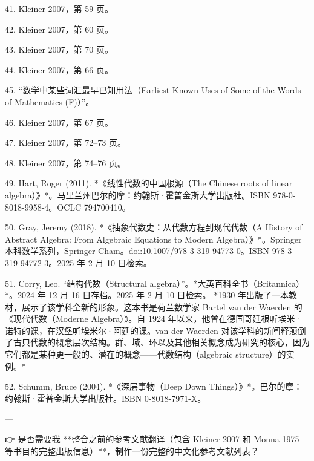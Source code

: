 \begin{enumerate}
41. Kleiner 2007，第 59 页。

42. Kleiner 2007，第 60 页。

43. Kleiner 2007，第 70 页。

44. Kleiner 2007，第 66 页。

45. “数学中某些词汇最早已知用法（Earliest Known Uses of Some of the Words of Mathematics (F)）”。

46. Kleiner 2007，第 67 页。

47. Kleiner 2007，第 72–73 页。

48. Kleiner 2007，第 74–76 页。

49. Hart, Roger (2011). *《线性代数的中国根源（The Chinese roots of linear algebra）》*。马里兰州巴尔的摩：约翰斯·霍普金斯大学出版社。ISBN 978-0-8018-9958-4。OCLC 794700410。

50. Gray, Jeremy (2018). *《抽象代数史：从代数方程到现代代数（A History of Abstract Algebra: From Algebraic Equations to Modern Algebra）》*。Springer 本科数学系列，Springer Cham。doi:10.1007/978-3-319-94773-0。ISBN 978-3-319-94772-3。2025 年 2 月 10 日检索。

51. Corry, Leo. “结构代数（Structural algebra）”。*大英百科全书（Britannica）*。2024 年 12 月 16 日存档。2025 年 2 月 10 日检索。
    *1930 年出版了一本教材，展示了该学科全新的形象。这本书是荷兰数学家 Bartel van der Waerden 的《现代代数（Moderne Algebra）》。自 1924 年以来，他曾在德国哥廷根听埃米·诺特的课，在汉堡听埃米尔·阿廷的课。van der Waerden 对该学科的新阐释颠倒了古典代数的概念层次结构。群、域、环以及其他相关概念成为研究的核心，因为它们都是某种更一般的、潜在的概念——代数结构（algebraic structure）的实例。*

52. Schumm, Bruce (2004). *《深层事物（Deep Down Things）》*。巴尔的摩：约翰斯·霍普金斯大学出版社。ISBN 0-8018-7971-X。

---

👉 是否需要我 **整合之前的参考文献翻译（包含 Kleiner 2007 和 Monna 1975 等书目的完整出版信息）**，制作一份完整的中文化参考文献列表？

\end{enumerate}